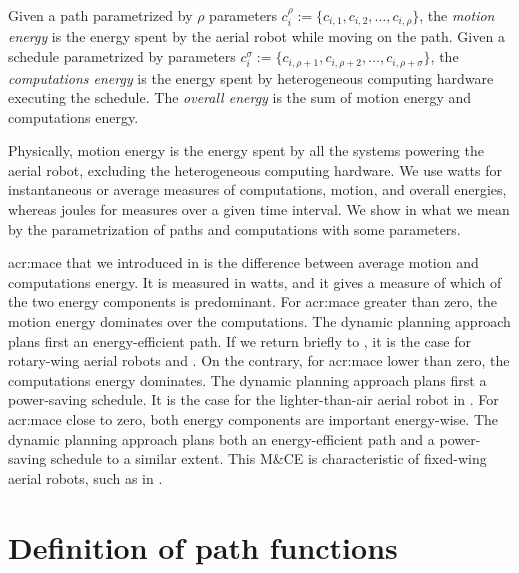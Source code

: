 \begin{defn}
  \label{def:comp-mot-energy}
  Given a path parametrized by $\rho$ parameters $c_i^\rho:=\{c_{i,1},c_{i,2},\dots,c_{i,\rho}\}$, the \emph{motion energy} is the energy spent by the aerial robot while moving on the path.
  Given a schedule parametrized by parameters $c_i^\sigma:=\{c_{i,\rho+1},c_{i,\rho+2},\dots,c_{i,\rho+\sigma}\}$, the \emph{computations energy} is the energy spent by heterogeneous computing hardware executing the schedule.
  The \emph{overall energy} is the sum of motion energy and computations energy.
\end{defn}

Physically, motion energy is the energy spent by all the systems powering the aerial robot, excluding the heterogeneous computing hardware. We use watts for instantaneous or average measures of computations, motion, and overall energies, whereas joules for measures over a given time interval. We show in  what we mean by the parametrization of paths and computations with some parameters.

\Gls{acr:mace} that we introduced in  is the difference between average motion and computations energy. It is measured in watts, and it gives a measure of which of the two energy components is predominant. For \Gls{acr:mace} greater than zero, the motion energy dominates over the computations. The dynamic planning approach plans first an energy-efficient path. If we return briefly to , it is the case for rotary-wing aerial robots  and . On the contrary, for \Gls{acr:mace} lower than zero, the computations energy dominates. The dynamic planning approach plans first a power-saving schedule. It is the case for the lighter-than-air aerial robot  in . For \Gls{acr:mace} close to zero, both energy components are important energy-wise. The dynamic planning approach plans both an energy-efficient path and a power-saving schedule to a similar extent. This M\&CE is characteristic of fixed-wing aerial robots, such as  in .


\section{Definition of path functions}
\label{sec:path-functions}

